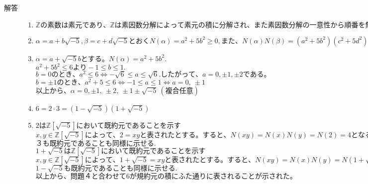 \documentclass[dvipdfmx]{jsarticle}
\begin{document}
\begin{description}
  \item[解答]
  \begin{enumerate}
    \item $\mathbb{Z}の素数は素元であり、\mathbb{Z}は素因数分解によって素元の積に分解され、また素因数分解の一意性から順番を無視して一意になる$

    \item $\alpha = a+b\sqrt{-5}, \beta = c+d\sqrt{-5}とおく N(\alpha) = a^2+5b^2 \geq 0, また、N(\alpha)N(\beta) = (a^2+5b^2)(c^2+5d^2) = (ac-5bd)^2+5(ad+cb)^2 = N(\alpha\beta)$

    \item $\alpha = a+\sqrt{-5}bとする。N(\alpha) = a^2+5b^2.$\\
    $a^2+5b^2 \leq 6 より-1 \leq b \leq 1. $\\
    $b = 0のとき、a^2 \leq 6 \Leftrightarrow -\sqrt{6} \leq a \leq  \sqrt{6}.したがって、a = 0 ,\pm 1, \pm 2 である。$\\
    $b = \pm 1のとき、a^2 + 5 \leq 6 \Leftrightarrow -1 \leq a \leq 1 \Leftrightarrow a = 0, \ \pm 1$\\
    $以上から、\alpha = 0,\pm 1,\  \pm 2, \ \pm 1 \pm \sqrt{-5} \ (複合任意)$

    \item $6 = 2 \cdot 3 = (1-\sqrt{-5})(1+\sqrt{-5})$

    \item $2は\mathbb{Z}[\sqrt{-5}]において既約元であることを示す$\\
    $x,y \in \mathbb{Z}[\sqrt{-5}]によって、2 = xyと表されたとする。すると、N(xy) = N(x)N(y) = N(2) = 4となる。N(x),N(y) \in \mathbb{Z}より、『N(x) = 2 かつ  N(y) = 2』または『N(x)=1 かつ N(y)=4』となる。(対称性を考慮している)。N(x) = a^2+5b^2=2となるa,b \in \mathbb{Z}は存在しないので、「N(x)=1 かつ N(y)=4」 \Leftrightarrow 「x = \pm 1 かつ y = \pm 2」.したがって、2は既約元.$\\
    $３も既約元であることも同様に示せる.$\\
    $1+\sqrt{-5}は\mathbb{Z}[\sqrt{-5}]において既約元であることを示す$\\
    $x,y \in \mathbb{Z}[\sqrt{-5}]によって、1+\sqrt{-5} = xyと表されたとする。すると、N(xy) = N(x)N(y) = N(1+\sqrt{-5}) = 6となる。N(x),N(y) \in \mathbb{Z}より、『N(x) = 2 かつ  N(y) = 3』または『N(x)=1 かつ N(y)=6』となる。(対称性を考慮している)。N(x) = a^2+5b^2=2となるa,b \in \mathbb{Z}は存在しないので、「N(x)=1 かつ N(y)=6」 \Leftrightarrow 「x = \pm 1 かつ y = \pm 11+\sqrt{-5}」.したがって、1+\sqrt{-5}は既約元.$\\
    $1-\sqrt{-5}も既約元であることも同様に示せる.$\\
    $以上から、問題４と合わせて6が規約元の積にふた通りに表されることが示された。$
  \end{enumerate}
\end{description}
\end{document}

